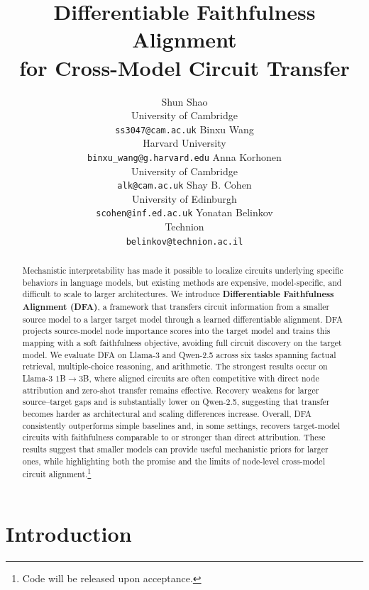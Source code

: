 \documentclass{article} %
\title{Differentiable Faithfulness Alignment \\ for Cross-Model Circuit Transfer}
\author{
Shun Shao \\
University of Cambridge \\
\texttt{ss3047@cam.ac.uk}
\And
Binxu Wang \\
Harvard University \\
\texttt{binxu\_wang@g.harvard.edu}
\And
Anna Korhonen \\
University of Cambridge \\
\texttt{alk@cam.ac.uk}
\AND
Shay B. Cohen \\
University of Edinburgh \\
\texttt{scohen@inf.ed.ac.uk}
\And
Yonatan Belinkov \\
Technion \\
\texttt{belinkov@technion.ac.il}
}
\begin{document}
\ifcolmsubmission
\linenumbers
\fi

\maketitle


\newcommand{\shaycomment}[1]{\textcolor{blue}{#1 -- Shay}}





\begin{abstract}
Mechanistic interpretability has made it possible to localize circuits underlying specific behaviors in language models, but existing methods are expensive, model-specific, and difficult to scale to larger architectures. We introduce \textbf{Differentiable Faithfulness Alignment (DFA)}, a framework that transfers circuit information from a smaller source model to a larger target model through a learned differentiable alignment. DFA projects source-model node importance scores into the target model and trains this mapping with a soft faithfulness objective, avoiding full circuit discovery on the target model. We evaluate DFA on Llama-3 and Qwen-2.5 across six tasks spanning factual retrieval, multiple-choice reasoning, and arithmetic. The strongest results occur on Llama-3 $1$B$\rightarrow3$B, where aligned circuits are often competitive with direct node attribution and zero-shot transfer remains effective. Recovery weakens for larger source--target gaps and is substantially lower on Qwen-2.5, suggesting that transfer becomes harder as architectural and scaling differences increase. Overall, DFA consistently outperforms simple baselines and, in some settings, recovers target-model circuits with faithfulness comparable to or stronger than direct attribution. These results suggest that smaller models can provide useful mechanistic priors for larger ones, while highlighting both the promise and the limits of node-level cross-model circuit alignment.\footnote{Code will be released upon acceptance.}
\end{abstract}


\section{Introduction}
\end{document}
